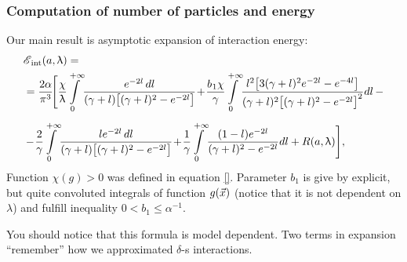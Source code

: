 \documentclass[10pt,t]{beamer}
\begin{document}
\begin{frame}
  \frametitle{Computation of number of particles and energy}



  Our main result is asymptotic expansion of interaction energy:
  \begin{equation}
    \label{eq:Energia-Casimira-dla-rodziny-ETC-09}
    \begin{split}
      &\EInt( a, \lambda ) = \\
      &=
        \frac{ 2 \alpha }{ \pi^{ 3 } } \! \Bigg[ \frac{ \chi }{ \lambda } \!
        \int\limits_{ 0 }^{ +\infty } \!
        \frac{ e^{ -2 l } \, dl }{ ( \gamma + l )
        \big[ ( \gamma + l )^{ 2 } - e^{ -2 l } \big] } \! + \!
        \frac{ b_{ \HorSpaceOne 1 } \chi }{ \gamma } \!
        \int\limits_{ 0 }^{ +\infty } \!
        \frac{ l^{ 2 } \big[ 3 ( \gamma + l )^{ 2 } e^{ -2 l } -
        e^{ -4 l } \big] }
        { ( \gamma + l )^{ 2 }
        \big[ ( \gamma + l )^{ 2 } - e^{ -2 l } \big]^{ 2 } } dl
        \, - \\[0.5em]
      &- \! \frac{ 2 }{ \gamma } \! \int\limits_{ 0 }^{ +\infty } \!
        \frac{ l e^{ -2 l }\, dl }{ ( \gamma + l )
        \big[ ( \gamma + l )^{ 2 } - e^{ -2 l } \big] } \! + \!
        \frac{ 1 }{ \gamma } \!
        \int\limits_{ 0 }^{ +\infty } \! \frac{ ( 1 - l ) e^{ -2 l } }{
        ( \gamma + l )^{ 2 } - e^{ -2 l } } dl + R( a, \lambda ) \Bigg],
    \end{split}
  \end{equation}
  Function $\chi( g ) > 0$ was defined in equation \eqref{}. Parameter
  $b_{ 1 }$ is give by explicit, but quite convoluted integrals of function
  $g( \vec{x} )$ (notice that it is not dependent on $\lambda$) and fulfill
  inequality $0 < b_{ 1 } \leq \alpha^{ -1 }$.

  You should notice that this formula is \alert{model dependent}. Two terms
  in expansion ``remember'' how we approximated $\delta$-s interactions.

\end{frame}
\end{document}
